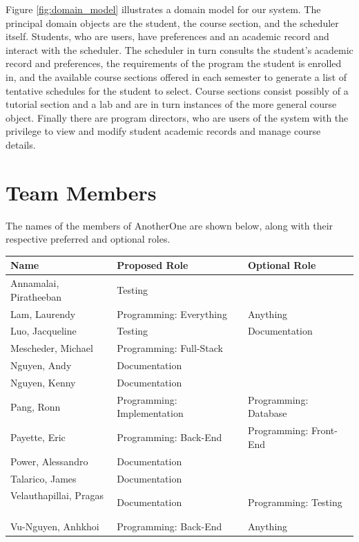 \documentclass[paper=a4, fontsize=11pt, oneside]{scrartcl} %
\begin{document}
Figure \ref{fig:domain_model} illustrates a domain model for our system. The principal domain objects are the student, the course section, and the scheduler itself. Students, who are users, have preferences and an academic record and interact with the scheduler. The scheduler in turn consults the student's academic record and preferences, the requirements of the program the student is enrolled in, and the available course sections offered in each semester to generate a list of tentative schedules for the student to select. Course sections consist possibly of a tutorial section and a lab and are in turn instances of the more general course object. Finally there are program directors, who are users of the system with the privilege to view and modify student academic records and manage course details.

\section*{Team Members}
The names of the members of AnotherOne are shown below, along with their respective preferred and optional roles. 

\begin{tabular} { l l l }
Name & Proposed Role & Optional Role \\ \hline \hline
Annamalai, Piratheeban  & Testing &    \\
Lam, Laurendy  & Programming: Everything & Anything   \\
Luo, Jacqueline  & Testing & Documentation   \\
Mescheder, Michael & Programming: Full-Stack &    \\
Nguyen, Andy  & Documentation &    \\
Nguyen, Kenny  & Documentation &    \\
Pang, Ronn  & Programming: Implementation & Programming: Database   \\
Payette, Eric  & Programming: Back-End & Programming: Front-End   \\
Power, Alessandro  & Documentation &    \\
Talarico, James  & Documentation &   \\
Velauthapillai, Pragas   & Documentation  & Programming: Testing   \\
Vu-Nguyen, Anhkhoi  & Programming: Back-End & Anything  
\end{tabular}
\end{document}
